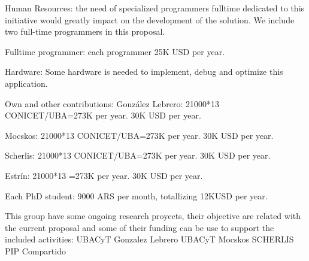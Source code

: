 \documentclass[a4paper,10pt]{article}
\begin{document}
Human Resources: the need of specialized programmers fulltime dedicated to this initiative would greatly impact on the development of the solution. We include two full-time programmers in this proposal.

Fulltime programmer: each programmer 25K USD per year.

Hardware: Some hardware is needed to implement, debug and optimize this application.

Own and other contributions:
Gonz\'alez Lebrero: 21000*13 CONICET/UBA=273K per year. 30K USD per year.

Mocskos: 21000*13 CONICET/UBA=273K per year. 30K USD per year.

Scherlis: 21000*13 CONICET/UBA=273K per year. 30K USD per year.

Estr\'in: 21000*13 =273K per year. 30K USD per year.

Each PhD student: 9000 ARS per month, totallizing 12KUSD per year.

This group have some ongoing research proyects, their objective are related with the current proposal and some of their funding can be use to support the included activities:
UBACyT Gonzalez Lebrero
UBACyT Mocskos
SCHERLIS
PIP Compartido
\end{document}
